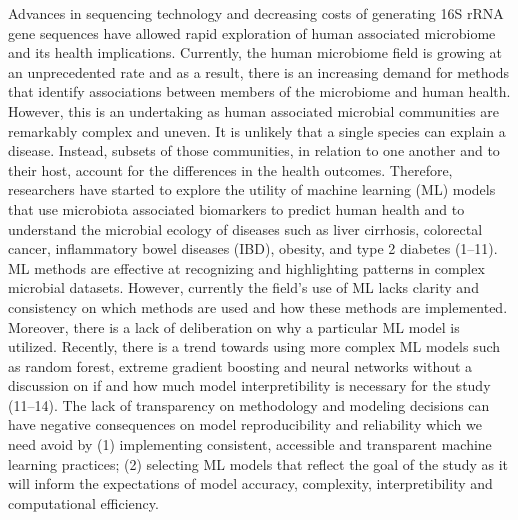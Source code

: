 \documentclass[11pt,]{article}
\begin{document}
Advances in sequencing technology and decreasing costs of generating 16S
rRNA gene sequences have allowed rapid exploration of human associated
microbiome and its health implications. Currently, the human microbiome
field is growing at an unprecedented rate and as a result, there is an
increasing demand for methods that identify associations between members
of the microbiome and human health. However, this is an undertaking as
human associated microbial communities are remarkably complex and
uneven. It is unlikely that a single species can explain a disease.
Instead, subsets of those communities, in relation to one another and to
their host, account for the differences in the health outcomes.
Therefore, researchers have started to explore the utility of machine
learning (ML) models that use microbiota associated biomarkers to
predict human health and to understand the microbial ecology of diseases
such as liver cirrhosis, colorectal cancer, inflammatory bowel diseases
(IBD), obesity, and type 2 diabetes (1--11). ML methods are effective at
recognizing and highlighting patterns in complex microbial datasets.
However, currently the field's use of ML lacks clarity and consistency
on which methods are used and how these methods are implemented.
Moreover, there is a lack of deliberation on why a particular ML model
is utilized. Recently, there is a trend towards using more complex ML
models such as random forest, extreme gradient boosting and neural
networks without a discussion on if and how much model interpretibility
is necessary for the study (11--14). The lack of transparency on
methodology and modeling decisions can have negative consequences on
model reproducibility and reliability which we need avoid by (1)
implementing consistent, accessible and transparent machine learning
practices; (2) selecting ML models that reflect the goal of the study as
it will inform the expectations of model accuracy, complexity,
interpretibility and computational efficiency.
\end{document}
